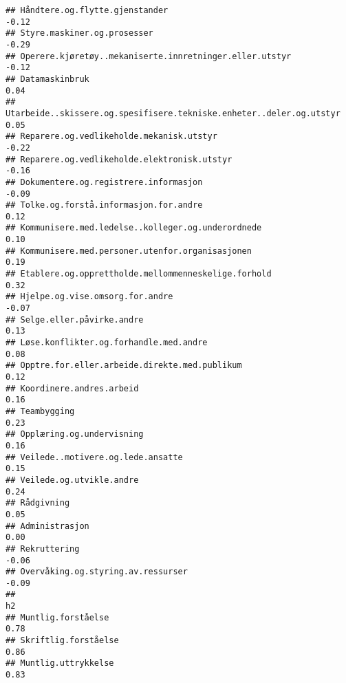 \documentclass[
]{article}
\begin{document}
\begin{verbatim}
## Håndtere.og.flytte.gjenstander                                                   -0.12
## Styre.maskiner.og.prosesser                                                      -0.29
## Operere.kjøretøy..mekaniserte.innretninger.eller.utstyr                          -0.12
## Datamaskinbruk                                                                    0.04
## Utarbeide..skissere.og.spesifisere.tekniske.enheter..deler.og.utstyr              0.05
## Reparere.og.vedlikeholde.mekanisk.utstyr                                         -0.22
## Reparere.og.vedlikeholde.elektronisk.utstyr                                      -0.16
## Dokumentere.og.registrere.informasjon                                            -0.09
## Tolke.og.forstå.informasjon.for.andre                                             0.12
## Kommunisere.med.ledelse..kolleger.og.underordnede                                 0.10
## Kommunisere.med.personer.utenfor.organisasjonen                                   0.19
## Etablere.og.opprettholde.mellommenneskelige.forhold                               0.32
## Hjelpe.og.vise.omsorg.for.andre                                                  -0.07
## Selge.eller.påvirke.andre                                                         0.13
## Løse.konflikter.og.forhandle.med.andre                                            0.08
## Opptre.for.eller.arbeide.direkte.med.publikum                                     0.12
## Koordinere.andres.arbeid                                                          0.16
## Teambygging                                                                       0.23
## Opplæring.og.undervisning                                                         0.16
## Veilede..motivere.og.lede.ansatte                                                 0.15
## Veilede.og.utvikle.andre                                                          0.24
## Rådgivning                                                                        0.05
## Administrasjon                                                                    0.00
## Rekruttering                                                                     -0.06
## Overvåking.og.styring.av.ressurser                                               -0.09
##                                                                                    h2
## Muntlig.forståelse                                                               0.78
## Skriftlig.forståelse                                                             0.86
## Muntlig.uttrykkelse                                                              0.83

\end{verbatim}
\end{document}
